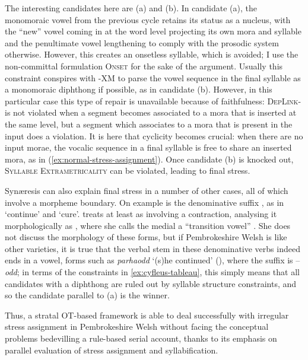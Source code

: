 The interesting candidates here are (a) and (b). In candidate (a), the monomoraic vowel from the previous cycle retains its status as a nucleus, with the \enquote{new} vowel coming in at the word level projecting its own mora and syllable and the penultimate vowel lengthening to comply with the prosodic system otherwise. However, this creates an onsetless syllable, which is avoided; I use the non\hyp committal formulation \textsc{Onset} for the sake of the argument. Usually this constraint conspires with \sy-\textsc{XM} to parse the vowel sequence in the final syllable as a monomoraic diphthong if possible, as in candidate (b). However, in this particular case this type of repair is unavailable because of faithfulness: \textsc{DepLink}-\mo[V] is not violated when a segment becomes associated to a mora that is inserted at the same level, but a segment which associates to a mora that is present in the input does a violation. It is here that cyclicity becomes crucial: when there are no input morae, the vocalic sequence in a final syllable is free to share an inserted mora, as in  (\ref{ex:normal-stress-assignment}). Once candidate (b) is knocked out, \textsc{Syllable Extrametricality} can be violated, leading to final stress.

Synæresis can also explain final stress in a number of other cases, all of which involve a morpheme boundary. On example is the denominative suffix , as in \ipa{[parˈhai]} `continue' and \ipa{[iaˈχai]} `cure'. \citet{awbery86:_pembr_welsh} treats at least \ipa{[iaˈχai]} as involving a contraction, analysing it morphologically as , where she calls the medial \ipa{[a]} a \enquote{transition vowel} \citep[p.~146]{awbery86:_pembr_welsh}. She does not discuss the morphology of these forms, but if Pembrokeshire Welsh is like other varieties, it is true that the verbal stem in these denominative verbs indeed ends in a vowel, \cf forms such as \emph{parhaodd} `(s)he continued' (\ipa{[parˈhaːoð]}), where the suffix is \mbox{--\emph{odd}}; in terms of the constraints in \ref{ex:cyfleus-tableau}, this simply means that all candidates with a diphthong are ruled out by syllable structure constraints, and so the candidate parallel to (a) is the winner.

Thus, a stratal OT-based framework is able to deal successfully with irregular stress assignment in Pembrokeshire Welsh without facing the conceptual problems bedevilling a rule-based serial account, thanks to its emphasis on parallel evaluation of stress assignment and syllabification.

